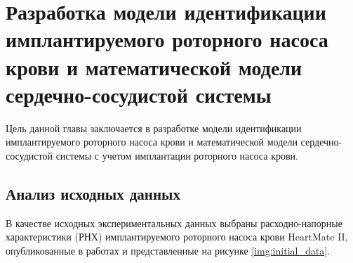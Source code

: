 \chapter{Разработка модели идентификации имплантируемого роторного насоса крови и математической модели сердечно-сосудистой системы} \label{chapt2}

Цель данной главы заключается в разработке модели идентификации имплантируемого роторного насоса крови и математической модели сердечно-сосудистой системы с учетом имплантации роторного насоса крови.  


\section{Анализ исходных данных}

В качестве исходных экспериментальных данных выбраны расходно-напорные характеристики (РНХ) имплантируемого роторного насоса крови HeartMate II, опубликованные в работах \cite{Pennings_2013, Stanfield_2012} и представленные на рисунке \ref{img:initial_data}.

